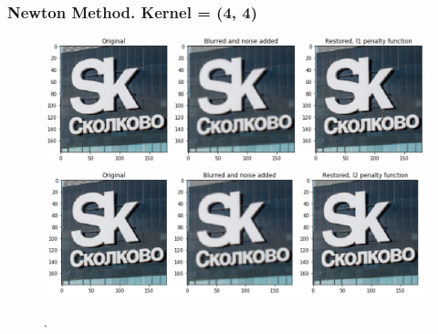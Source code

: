 \documentclass[hyperref={pdfpagelabels=false}]{beamer}
\begin{document}
\begin{frame}
\frametitle{Newton Method. Kernel = (4, 4)}

\begin{center}
\begin{figure}[h]
\begin{adjustwidth}{-0.2cm}{-0.5 cm}
\includegraphics[scale=0.27]{new_small_l1.png} \\
\includegraphics[scale=0.27]{new_small_l2.png} \\
\end{adjustwidth}
\caption{.}
\end{figure}
\end{center}

\end{frame}
\end{document}
